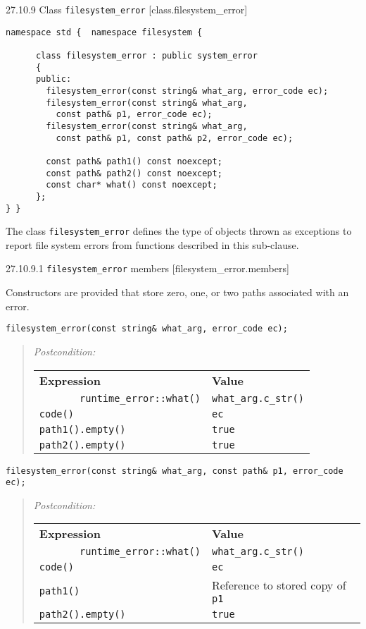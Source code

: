 27.10.9 Class \texttt{filesystem\_error} {[}class.filesystem\_error{]}

\begin{verbatim}
namespace std {  namespace filesystem { 

      class filesystem_error : public system_error
      {
      public:
        filesystem_error(const string& what_arg, error_code ec);
        filesystem_error(const string& what_arg,
          const path& p1, error_code ec);
        filesystem_error(const string& what_arg,
          const path& p1, const path& p2, error_code ec);

        const path& path1() const noexcept;
        const path& path2() const noexcept;
        const char* what() const noexcept;
      };
} }
\end{verbatim}

The class \texttt{filesystem\_error} defines the type of objects thrown
as exceptions to report file system errors from functions described in
this sub-clause.

27.10.9.1 \texttt{filesystem\_error} members
{[}filesystem\_error.members{]}

Constructors are provided that store zero, one, or two paths associated
with an error.

\begin{verbatim}
filesystem_error(const string& what_arg, error_code ec);
\end{verbatim}

\begin{quote}
\emph{Postcondition:}

\begin{longtable}[c]{@{}ll@{}}
\toprule
\textbf{Expression} & \textbf{Value}\tabularnewline
\texttt{\ \ \ \ \ \ \ runtime\_error::what()} &
\texttt{what\_arg.c\_str()}\tabularnewline
\texttt{code()} & \texttt{ec}\tabularnewline
\texttt{path1().empty()} & \texttt{true}\tabularnewline
\texttt{path2().empty()} & \texttt{true}\tabularnewline
\bottomrule
\end{longtable}
\end{quote}

\begin{verbatim}
filesystem_error(const string& what_arg, const path& p1, error_code ec);
\end{verbatim}

\begin{quote}
\emph{Postcondition:}

\begin{longtable}[c]{@{}ll@{}}
\toprule
\textbf{Expression} & \textbf{Value}\tabularnewline
\texttt{\ \ \ \ \ \ \ runtime\_error::what()} &
\texttt{what\_arg.c\_str()}\tabularnewline
\texttt{code()} & \texttt{ec}\tabularnewline
\texttt{path1()} & Reference to stored copy of
\texttt{p1}\tabularnewline
\texttt{path2().empty()} & \texttt{true}\tabularnewline
\bottomrule
\end{longtable}
\end{quote}

